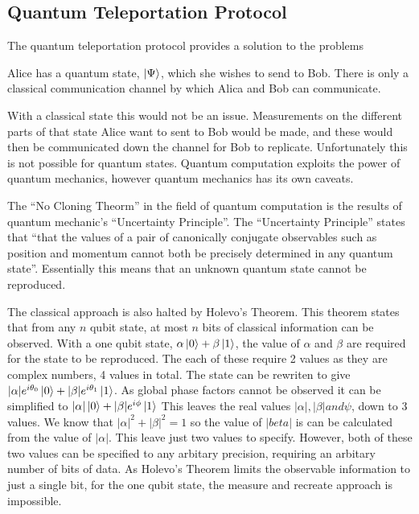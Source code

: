 \subsection{Quantum Teleportation Protocol}
\label{sec:quantteleproto}

The quantum teleportation protocol provides a solution to the problems
\begin{center}
Alice has a quantum state, $\left\vert{\Psi}\right\rangle$, which she wishes to send to Bob.
There is only a classical communication channel by which Alica and Bob can communicate.
\end{center}

With a classical state this would not be an issue.
Measurements on the different parts of that state Alice want to sent to Bob would be made, and these would then be communicated down the channel for Bob to replicate.
Unfortunately this is not possible for quantum states.
Quantum computation exploits the power of quantum mechanics, however quantum mechanics has its own caveats.

The ``No Cloning Theorm'' in the field of quantum computation is the results of quantum mechanic's ``Uncertainty Principle''.
The ``Uncertainty Principle'' states that ``that
the values of a pair of canonically conjugate observables such as position and momentum cannot both
be precisely determined in any quantum state''\cite{uncerth}.
Essentially this means that an unknown quantum state cannot be reproduced.

The classical approach is also halted by Holevo's Theorem.
This theorem states that from any $n$ qubit state, at most $n$ bits of classical information can be observed.
With a one qubit state, $\alpha\left\vert{0}\right\rangle+\beta\left\vert{1}\right\rangle$, the value of $\alpha$ and $\beta$ are required for the state to be reproduced.
The each of these require 2 values as they are complex numbers, 4 values in total.
The state can be rewriten to give $|\alpha|e^{i\theta_0}\left\vert{0}\right\rangle+|\beta|e^{i\theta_1}\left\vert{1}\right\rangle$.
As global phase factors cannot be observed it can be simplified to $|\alpha|\left\vert{0}\right\rangle+|\beta|e^{i\phi}\left\vert{1}\right\rangle$
This leaves the real values $|\alpha|, |\beta| and \psi$, down to 3 values.
We know that $|\alpha|^2+|\beta|^2=1$ so the value of $|beta|$ is can be calculated from the value of $|\alpha|$.
This leave just two values to specify.
However, both of these two values can be specified to any arbitary precision, requiring an arbitary number of bits of data.
As Holevo's Theorem limits the observable information to just a single bit, for the one qubit state, the measure and recreate approach is impossible.

